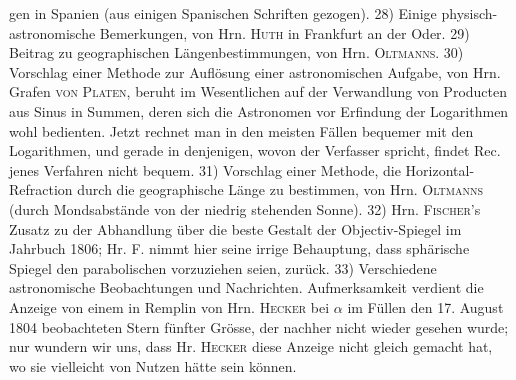 \noindent gen in Spanien (aus einigen Spanischen Schriften gezogen). 28) Einige physisch-astronomische Bemerkungen, von Hrn. \textsc{Huth} in Frankfurt an der Oder. 29) Beitrag zu geographischen Längenbestimmungen, von Hrn. \textsc{Oltmanns}. 30) Vorschlag einer Methode zur Auflösung einer astronomischen Aufgabe, von Hrn. Grafen \textsc{von Platen}, beruht im Wesentlichen auf der Verwandlung von Producten aus Sinus in Summen, deren sich die Astronomen vor Erfindung der Logarithmen wohl bedienten. Jetzt rechnet man in den meisten Fällen bequemer mit den Logarithmen, und gerade in denjenigen, wovon der Verfasser spricht, findet Rec. jenes Verfahren nicht bequem. 31) Vorschlag einer Methode, die Horizontal-Refraction durch die geographische Länge zu bestimmen, von Hrn. \textsc{Oltmanns} (durch Mondsabstände von der niedrig stehenden Sonne). 32) Hrn. \textsc{Fischer}'s Zusatz zu der Abhandlung über die beste Gestalt der Objectiv-Spiegel im Jahrbuch 1806; Hr. F. nimmt hier seine irrige Behauptung, dass sphärische Spiegel den parabolischen vorzuziehen seien, zurück. 33) Verschiedene astronomische Beobachtungen und Nachrichten. Aufmerksamkeit verdient die Anzeige von einem in Remplin von Hrn. \textsc{Hecker} bei $\alpha$ im Füllen den 17. August 1804 beobachteten Stern fünfter Grösse, der nachher nicht wieder gesehen wurde; nur wundern wir uns, dass Hr. \textsc{Hecker} diese Anzeige nicht gleich gemacht hat, wo sie vielleicht von Nutzen hätte sein können.
